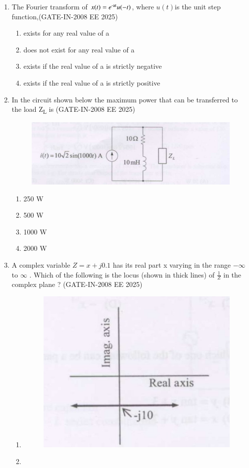 \documentclass[journal,12pt,onecolumn]{IEEEtran}
\theoremstyle{remark}
\begin{document}
\begin{enumerate}[label=Q.\arabic*,start=1]
    \item The Fourier transform of $x(t)=e\textsuperscript{-at}u(-t)$, where $u(t)$is the unit step function,(GATE-IN-2008 EE 2025)
    \begin{enumerate} 
        \item exists for any real value of a
        \item does not exist for any real value of a
        \item exists if the real value of a is strictly negative
        \item exists if the real value of a is strictly positive
    \end{enumerate}
    
    \item In the circuit shown below the maximum power that can be transferred to the load Z\textsubscript{L} is (GATE-IN-2008 EE 2025)

        \begin{figure}[H]
    \centering
    \includegraphics[width=0.5\linewidth]{figs/i7.jpg}
    \label{fig:placeholder7}
\end{figure}
    \begin{enumerate} 
        \item 250 W
        \item 500 W
        \item 1000 W
        \item 2000 W
    \end{enumerate}
    
    \item A complex variable $Z=x + j0.1$ has its real part x varying in the range $-\infty$ to $\infty$ . Which of the following is the locus (shown in thick lines) of \(\frac{1}{Z}\) in the complex plane ? (GATE-IN-2008 EE 2025)
    \begin{enumerate} 
        \item  
        
       \begin{figure}[H]
    \centering
    \includegraphics[width=0.5\linewidth]{figs/i8.jpg}
    \label{fig:placeholder8}
\end{figure}
        \item  


\end{enumerate}
\end{enumerate}
\end{document}
